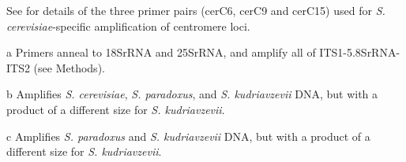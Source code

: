 \documentclass[12pt]{article}
\begin{document}
\begin{table}[h!]
\begin{threeparttable}
    \begin{tablenotes}
      \small
      \item See \citet{bensasson_evidence_2011} for details of the three primer pairs (cerC6, cerC9 and cerC15) used for \textit{S. cerevisiae}-specific amplification of centromere loci. 
      \item [a] Primers anneal to 18SrRNA and 25SrRNA, and amplify all of ITS1-5.8SrRNA-ITS2 (see Methods). 
      \item [b] Amplifies \textit{S. cerevisiae}, \textit{S. paradoxus}, and \textit{S. kudriavzevii} DNA, but with a product of a different size for \textit{S. kudriavzevii}. 
      \item [c] Amplifies \textit{S. paradoxus} and \textit{S. kudriavzevii} DNA, but with a product of a different size for \textit{S. kudriavzevii}.      
     \end{tablenotes}
 \end{threeparttable}
\end{table}
\clearpage

\setcounter{figure}{0}
\renewcommand{\figurename}{Supplemental Figure}
\end{document}
